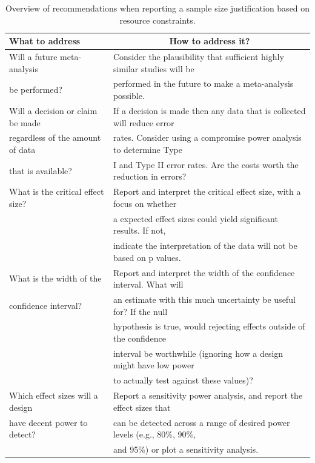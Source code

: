\documentclass[
  english,
  ,jou,floatsintext]{apa6}
\begin{document}
\begin{table}[tbp]

\begin{center}
\begin{threeparttable}

\caption{\label{tab:table-pow-rec}Overview of recommendations when reporting a sample size justification based on resource constraints.}

\begin{tabular}{ll}
\toprule
What to address & \multicolumn{1}{c}{How to address it?}\\
\midrule
Will a future meta-analysis & Consider the plausibility that sufficient highly similar studies will be\\
be performed? & performed in the future to make a meta-analysis possible.\\ \midrule
Will a decision or claim be made & If a decision is made then any data that is collected will reduce error\\
regardless of the amount of data & rates. Consider using a compromise power analysis to determine Type\\
that is available? & I and Type II error rates. Are the costs worth the reduction in errors?\\ \midrule
What is the critical effect size? & Report and interpret the critical effect size, with a focus on whether\\
 & a expected effect sizes could yield significant results. If not,\\
 & indicate the interpretation of the data will not be based on p values.\\ \midrule
What is the width of the & Report and interpret the width of the confidence interval. What will\\
confidence interval? & an estimate with this much uncertainty be useful for? If the null\\
 & hypothesis is true, would rejecting effects outside of the confidence\\
 & interval be worthwhile (ignoring how a design might have low power\\
 & to actually test against these values)?\\ \midrule
Which effect sizes will a design & Report a sensitivity power analysis, and report the effect sizes that\\
have decent power to detect? & can be detected across a range of desired power levels (e.g., 80\%, 90\%,\\
 & and 95\%) or plot a sensitivity analysis.\\
\bottomrule
\end{tabular}

\end{threeparttable}
\end{center}

\end{table}
\end{document}
